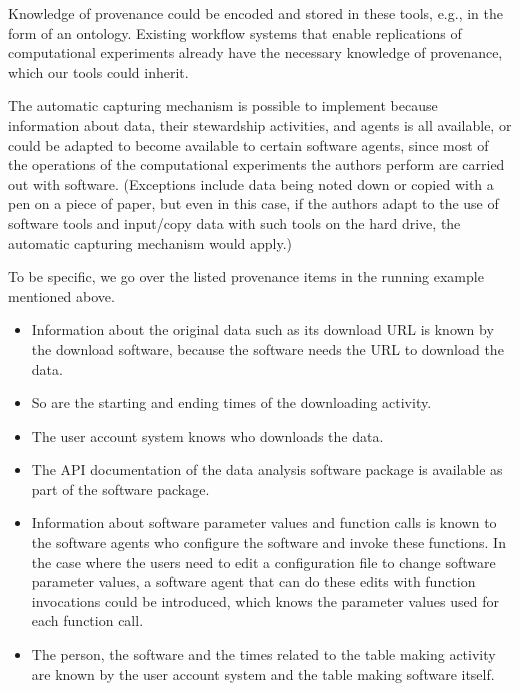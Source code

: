 Knowledge of provenance could be encoded and stored in these tools, e.g., in the form of an ontology. 
Existing workflow systems that enable replications of computational experiments already have the 
necessary knowledge of provenance, which our tools could inherit.

The automatic capturing mechanism is possible to implement because information about data, their stewardship 
activities, and agents is all available, or could be adapted to become available to certain software 
agents, since most of the operations of the computational experiments the authors perform are carried 
out with software. (Exceptions include data being noted down or copied with a pen on a piece of paper, 
but even in this case, if the authors adapt to the use of software tools and input/copy data with such 
tools on the hard drive, the automatic capturing mechanism would apply.)

To be specific, we go over the 
listed provenance items in the running example mentioned above. 
\begin{itemize}
\item Information about the original data such as its download URL is known by the download software, 
because the software needs the URL to download the data. 
\item So are the starting and ending times of the downloading activity. 
\item The user account system knows who downloads the data. 
\item The API documentation of the data analysis software package is available as part of the software 
package. 
\item Information about software parameter values and function calls is known to the software agents who 
configure the software and invoke these functions. In the case where the users need to edit a 
configuration file to change software parameter values, a software agent that can do these edits with 
function invocations could be introduced, which knows the parameter values used for each function call.
\item The person, the software and the times related to the table making activity are known by the user 
account system and the table making software itself.
\end{itemize}


